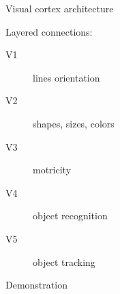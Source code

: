 \begin{frame}{Visual cortex architecture}
  \begin{minipage}[l]{0.50\linewidth}
  \end{minipage}\hfill
  \begin{minipage}[l]{0.49\linewidth}
    Layered connections:
    \begin{description}
    \item[V1] lines orientation
    \item[V2] shapes, sizes, colors
    \item[V3] motricity
    \item[V4] object recognition
    \item[V5] object tracking
    \end{description}
  \end{minipage}\hfill
\end{frame}

\begin{frame}{Demonstration}
\end{frame}
